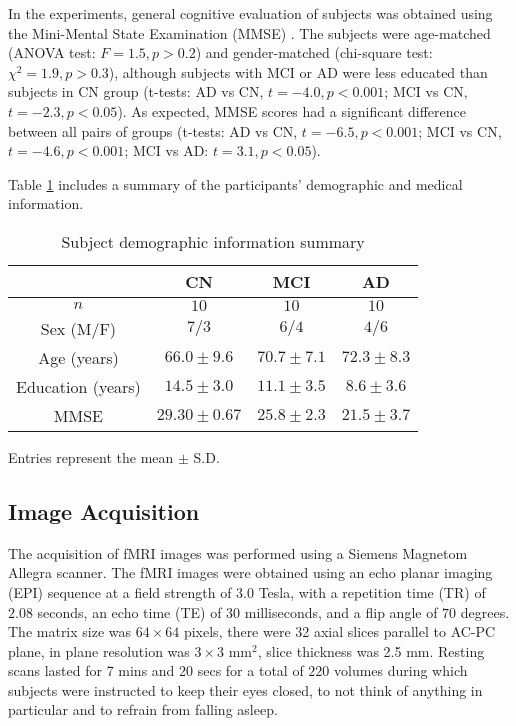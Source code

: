 \documentclass[12pt,reqno]{amsart}
\theoremstyle{definition}
\begin{document}
In the experiments, general cognitive evaluation of subjects was obtained using the Mini-Mental State Examination (MMSE) \citep{harvarddata}. The subjects were age-matched (ANOVA test: $F = 1.5, p > 0.2$) and gender-matched (chi-square test: $\chi^2 = 1.9, p > 0.3$), although subjects with MCI or AD were less educated than subjects in CN group (t-tests: AD vs CN, $t = -4.0, p < 0.001$; MCI vs CN, $t = -2.3, p < 0.05$). As expected, MMSE scores had a significant difference between all pairs of groups (t-tests: AD vs CN, $t = -6.5, p < 0.001$; MCI vs CN, $t = -4.6, p < 0.001$; MCI vs AD: $t = 3.1, p < 0.05$).

Table \ref{tab:data} includes a summary of the participants' demographic and medical information.

\begin{table}[t]
    \centering
\caption{Subject demographic information summary}\label{tab:data}
    \begin{tabular}{cccc}
    \hline
         & CN & MCI & AD\\
         \hline
        $n$ & $10$ & $10$ & $10$ \\
        Sex (M/F) & $7/3$ & $6/4$ & $4/6$ \\
        Age (years) & $66.0\pm 9.6$ & $70.7 \pm 7.1$ & $72.3\pm 8.3$ \\
        Education (years) & $14.5 \pm 3.0$ & $11.1 \pm 3.5$ & $8.6 \pm 3.6$ \\
        MMSE & $29.30\pm 0.67$  & $25.8\pm 2.3$ & $21.5\pm 3.7$\\
        \hline
    \end{tabular}
    \vspace{2mm}
    
Entries represent the mean $\pm$ S.D.
\end{table}

\subsection{Image Acquisition}
The acquisition of fMRI images was performed using a Siemens Magnetom Allegra scanner. The fMRI images were obtained using an echo planar imaging (EPI) sequence at a field strength of $3.0$ Tesla, with a repetition time (TR) of $2.08$ seconds, an echo time (TE) of $30$ milliseconds, and a flip angle of $70$ degrees. The matrix size was $64 \times 64$ pixels, there were 32 axial slices parallel to AC-PC plane, in plane resolution was $3\times 3$ mm$^2$, slice thickness was 2.5 mm. Resting scans lasted for 7 mins and 20 secs for a total of $220$ volumes during which subjects were instructed to keep their eyes closed, to not think of anything in particular and to refrain from falling asleep.
\end{document}
